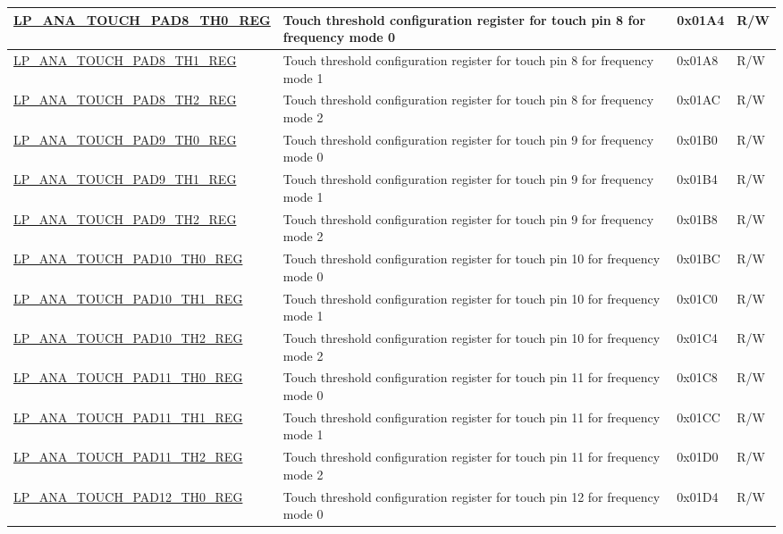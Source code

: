 \begin{longtable}{ | l | p{12cm} | p{1.3cm} | p{1.2cm} | }
\hyperref[regdesc:LPANATOUCHPAD0TH0REG]{LP\_ANA\_TOUCH\_PAD8\_TH0\_REG} & Touch threshold configuration register for touch pin 8 for frequency mode 0  & 0x01A4 & R/W \\ \hline
\hyperref[regdesc:LPANATOUCHPAD0TH1REG]{LP\_ANA\_TOUCH\_PAD8\_TH1\_REG} & Touch threshold configuration register for touch pin 8 for frequency mode 1  & 0x01A8 & R/W \\ \hline
\hyperref[regdesc:LPANATOUCHPAD0TH2REG]{LP\_ANA\_TOUCH\_PAD8\_TH2\_REG} & Touch threshold configuration register for touch pin 8 for frequency mode 2  & 0x01AC & R/W \\ \hline
\hyperref[regdesc:LPANATOUCHPAD0TH0REG]{LP\_ANA\_TOUCH\_PAD9\_TH0\_REG} & Touch threshold configuration register for touch pin 9 for frequency mode 0  & 0x01B0 & R/W \\ \hline
\hyperref[regdesc:LPANATOUCHPAD0TH1REG]{LP\_ANA\_TOUCH\_PAD9\_TH1\_REG} & Touch threshold configuration register for touch pin 9 for frequency mode 1 & 0x01B4 & R/W \\ \hline
\hyperref[regdesc:LPANATOUCHPAD0TH2REG]{LP\_ANA\_TOUCH\_PAD9\_TH2\_REG} & Touch threshold configuration register for touch pin 9 for frequency mode 2 & 0x01B8 & R/W \\ \hline
\hyperref[regdesc:LPANATOUCHPAD0TH0REG]{LP\_ANA\_TOUCH\_PAD10\_TH0\_REG} & Touch threshold configuration register for touch pin 10 for frequency mode 0  & 0x01BC & R/W \\ \hline
\hyperref[regdesc:LPANATOUCHPAD0TH1REG]{LP\_ANA\_TOUCH\_PAD10\_TH1\_REG} & Touch threshold configuration register for touch pin 10 for frequency mode 1 & 0x01C0 & R/W \\ \hline
\hyperref[regdesc:LPANATOUCHPAD0TH2REG]{LP\_ANA\_TOUCH\_PAD10\_TH2\_REG} & Touch threshold configuration register for touch pin 10 for frequency mode 2 & 0x01C4 & R/W \\ \hline
\hyperref[regdesc:LPANATOUCHPAD0TH0REG]{LP\_ANA\_TOUCH\_PAD11\_TH0\_REG} & Touch threshold configuration register for touch pin 11 for frequency mode 0  & 0x01C8 & R/W \\ \hline
\hyperref[regdesc:LPANATOUCHPAD0TH1REG]{LP\_ANA\_TOUCH\_PAD11\_TH1\_REG} & Touch threshold configuration register for touch pin 11 for frequency mode 1 & 0x01CC & R/W \\ \hline
\hyperref[regdesc:LPANATOUCHPAD0TH2REG]{LP\_ANA\_TOUCH\_PAD11\_TH2\_REG} & Touch threshold configuration register for touch pin 11 for frequency mode 2  & 0x01D0 & R/W \\ \hline
\hyperref[regdesc:LPANATOUCHPAD0TH0REG]{LP\_ANA\_TOUCH\_PAD12\_TH0\_REG} & Touch threshold configuration register for touch pin 12 for frequency mode 0  & 0x01D4 & R/W \\ \hline

\end{longtable}
